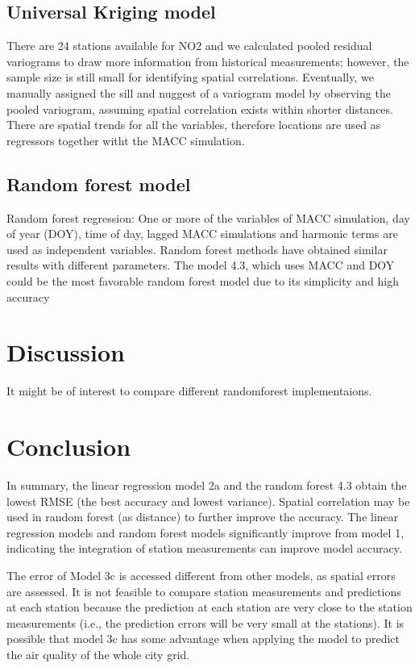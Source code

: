 \documentclass{article}
\begin{document}
\subsection{Universal Kriging model}  
There are 24 stations available for NO2 and we calculated pooled residual variograms to draw more information from historical measurements; however, the sample size is still small for identifying spatial correlations. Eventually, we manually assigned the sill and nuggest of a variogram model by observing the pooled variogram, assuming spatial correlation exists within shorter distances. There are spatial trends for all the variables, therefore locations are used as regressors together witht the MACC simulation.  

\subsection{Random forest model}  
Random forest regression: One or more of the variables of MACC simulation, day of year (DOY), time of day, lagged MACC simulations and harmonic terms are used as independent variables. Random forest methods have obtained similar results with different parameters. The model 4.3, which uses MACC and DOY could be the most favorable random forest model due to its simplicity and high accuracy 


\section{Discussion}
It might be of interest to compare different randomforest implementaions. 

\section{Conclusion}

In summary, the linear regression model 2a and the random forest 4.3 obtain the lowest RMSE (the best accuracy and lowest variance). Spatial correlation may be used in random forest (as distance) to further improve the accuracy. The linear regression models and random forest models significantly improve from model 1, indicating the integration of station measurements can improve model accuracy. 

The error of Model 3c is accessed different from other models, as spatial errors are assessed. It is not feasible to compare station measurements and predictions at each station because the prediction at each station are very close to the station measurements (i.e., the prediction errors will be very small at the stations). It is possible that model 3c has some advantage when applying the model to predict the air quality of the whole city grid.    



\end{document}

